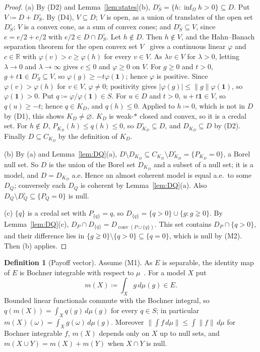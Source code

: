 \documentclass[11pt]{article}
\theoremstyle{definition}
\newtheorem{definition}[theorem]{Definition}
\newcommand{\R}{\mathbb R}
\newcommand{\one}{\mathbf 1}
\DeclareMathOperator{\conv}{conv}
\begin{document}
\begin{proof}
(a) By (D2) and Lemma~\ref{lem:states}(b), $D^\circ_S=\{h:\inf_\Omega h>0\}\subseteq D$. Put $V\coloneqq D+D^\circ_S$. By (D4), $V\subseteq D$; $V$ is open, as a union of translates of the open set $D^\circ_S$; $V$ is a convex cone, as a sum of convex cones; and $D^\circ_S\subseteq V$, since $e=e/2+e/2$ with $e/2\in D\cap D^\circ_S$. Let $h\notin D$. Then $h\notin V$, and the Hahn--Banach separation theorem for the open convex set $V$~\cite[Theorem~3.4]{Rudin} gives a continuous linear $\varphi$ and $c\in\R$ with $\varphi(v)>c\ge\varphi(h)$ for every $v\in V$. As $\lambda v\in V$ for $\lambda>0$, letting $\lambda\to0$ and $\lambda\to\infty$ gives $c\le0$ and $\varphi\ge0$ on $V$. For $g\ge0$ and $t>0$, $g+t\one\in D^\circ_S\subseteq V$, so $\varphi(g)\ge-t\varphi(\one)$; hence $\varphi$ is positive. Since $\varphi(v)>\varphi(h)$ for $v\in V$, $\varphi\ne0$; positivity gives $|\varphi(g)|\le\|g\|\varphi(\one)$, so $\varphi(\one)>0$. Put $q\coloneqq\varphi/\varphi(\one)\in S$. For $u\in D$ and $t>0$, $u+t\one\in V$, so $q(u)\ge-t$; hence $q\in K_D$, and $q(h)\le0$. Applied to $h\coloneqq0$, which is not in $D$ by (D1), this shows $K_D\ne\varnothing$. $K_D$ is weak-$\ast$ closed and convex, so it is a credal set. For $h\notin D$, $P_{K_D}(h)\le q(h)\le0$, so $D^\circ_{K_D}\subseteq D$, and $D_{K_D}\subseteq D$ by (D2). Finally $D\subseteq C_{K_D}$ by the definition of $K_D$.

(b) By (a) and Lemma~\ref{lem:DQ}(a), $D\setminus D_{K_D}\subseteq C_{K_D}\setminus D^\circ_{K_D}=\{P_{K_D}=0\}$, a Borel null set. So $D$ is the union of the Borel set $D_{K_D}$ and a subset of a null set; it is a model, and $D=D_{K_D}$ a.e. Hence an almost coherent model is equal a.e.\ to some $D_Q$; conversely each $D_Q$ is coherent by Lemma~\ref{lem:DQ}(a). Also $D_Q\setminus D^\circ_Q\subseteq\{P_Q=0\}$ is null.

(c) $\{q\}$ is a credal set with $P_{\{q\}}=q$, so $D_{\{q\}}=\{q>0\}\cup\{g:g\gneq0\}$. By Lemma~\ref{lem:DQ}(c), $D_P\cap D_{\{q\}}=D_{\conv(P\cup\{q\})}$. This set contains $D_P\cap\{q>0\}$, and their difference lies in $\{g\gneq0\}\setminus\{q>0\}\subseteq\{q=0\}$, which is null by (M2). Then (b) applies.
\end{proof}

\begin{definition}[Payoff vector]\label{def:payoff}
Assume (M1). As $E$ is separable, the identity map of $E$ is Bochner integrable with respect to $\mu$~\cite{DiestelUhl}. For a model $X$ put
\[
m(X)\coloneqq\int_Xg\,d\mu(g)\in E .
\]
Bounded linear functionals commute with the Bochner integral, so $q(m(X))=\int_Xq(g)\,d\mu(g)$ for every $q\in S$; in particular $m(X)(\omega)=\int_Xg(\omega)\,d\mu(g)$. Moreover $\|\int f\,d\mu\|\le\int\|f\|\,d\mu$ for Bochner integrable $f$, $m(X)$ depends only on $X$ up to null sets, and $m(X\cup Y)=m(X)+m(Y)$ when $X\cap Y$ is null.
\end{definition}
\end{document}
